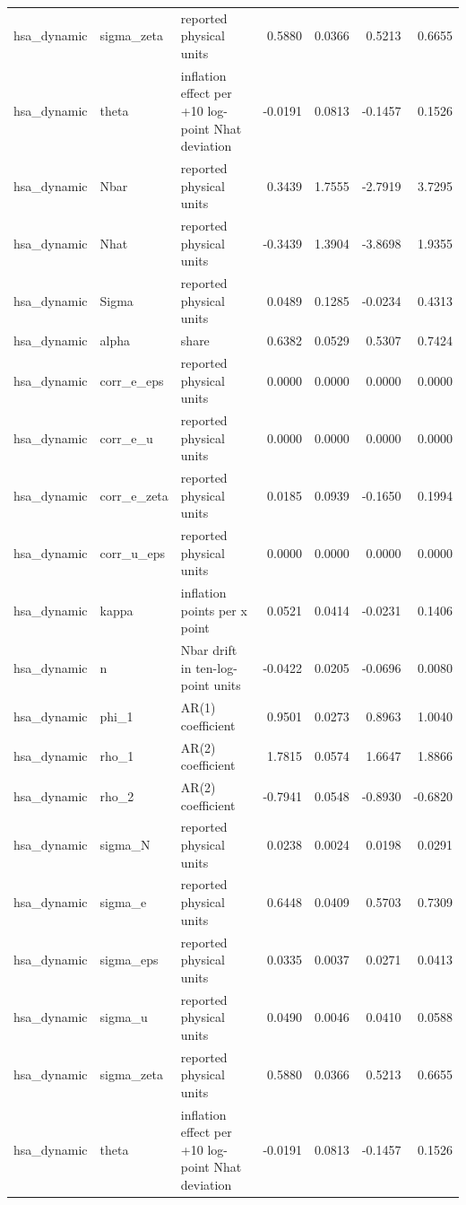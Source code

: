 \begin{tabular}{lllrrrr}
hsa\_dynamic & sigma\_zeta & reported physical units & 0.5880 & 0.0366 & 0.5213 & 0.6655 \\
hsa\_dynamic & theta & inflation effect per +10 log-point Nhat deviation & -0.0191 & 0.0813 & -0.1457 & 0.1526 \\
hsa\_dynamic & Nbar & reported physical units & 0.3439 & 1.7555 & -2.7919 & 3.7295 \\
hsa\_dynamic & Nhat & reported physical units & -0.3439 & 1.3904 & -3.8698 & 1.9355 \\
hsa\_dynamic & Sigma & reported physical units & 0.0489 & 0.1285 & -0.0234 & 0.4313 \\
hsa\_dynamic & alpha & share & 0.6382 & 0.0529 & 0.5307 & 0.7424 \\
hsa\_dynamic & corr\_e\_eps & reported physical units & 0.0000 & 0.0000 & 0.0000 & 0.0000 \\
hsa\_dynamic & corr\_e\_u & reported physical units & 0.0000 & 0.0000 & 0.0000 & 0.0000 \\
hsa\_dynamic & corr\_e\_zeta & reported physical units & 0.0185 & 0.0939 & -0.1650 & 0.1994 \\
hsa\_dynamic & corr\_u\_eps & reported physical units & 0.0000 & 0.0000 & 0.0000 & 0.0000 \\
hsa\_dynamic & kappa & inflation points per x point & 0.0521 & 0.0414 & -0.0231 & 0.1406 \\
hsa\_dynamic & n & Nbar drift in ten-log-point units & -0.0422 & 0.0205 & -0.0696 & 0.0080 \\
hsa\_dynamic & phi\_1 & AR(1) coefficient & 0.9501 & 0.0273 & 0.8963 & 1.0040 \\
hsa\_dynamic & rho\_1 & AR(2) coefficient & 1.7815 & 0.0574 & 1.6647 & 1.8866 \\
hsa\_dynamic & rho\_2 & AR(2) coefficient & -0.7941 & 0.0548 & -0.8930 & -0.6820 \\
hsa\_dynamic & sigma\_N & reported physical units & 0.0238 & 0.0024 & 0.0198 & 0.0291 \\
hsa\_dynamic & sigma\_e & reported physical units & 0.6448 & 0.0409 & 0.5703 & 0.7309 \\
hsa\_dynamic & sigma\_eps & reported physical units & 0.0335 & 0.0037 & 0.0271 & 0.0413 \\
hsa\_dynamic & sigma\_u & reported physical units & 0.0490 & 0.0046 & 0.0410 & 0.0588 \\
hsa\_dynamic & sigma\_zeta & reported physical units & 0.5880 & 0.0366 & 0.5213 & 0.6655 \\
hsa\_dynamic & theta & inflation effect per +10 log-point Nhat deviation & -0.0191 & 0.0813 & -0.1457 & 0.1526 \\

\end{tabular}
